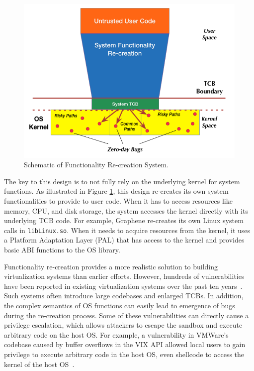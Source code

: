 \begin{figure}%
\centering
\includegraphics[width=1.0\columnwidth]{diagram/Virtualization_Design_Model_02.png}
\caption{\small Schematic of Functionality Re-creation System.}
\label{fig:design_functionality_reimplementation}
\end{figure}

The key to this design is to not fully rely on the underlying
kernel for system functions. As illustrated in Figure \ref{fig:design_functionality_reimplementation},
this design re-creates its own system functionalities to provide to user code.
When it has to %
access resources like memory, CPU, and disk storage, the system accesses the kernel directly with
its underlying TCB code.
For example, Graphene \cite{Graphene-14} re-creates
its own Linux system calls in
\texttt{libLinux.so}. When it needs to acquire resources from
the kernel, it uses a
Platform Adaptation Layer (PAL)  that has access to the kernel
and provides basic ABI functions to the OS library.

Functionality re-creation provides a more realistic solution to building
virtualization systems than earlier efforts.
However, hundreds of vulnerabilities have been
reported in existing virtualization systems over the past ten years~\cite{NVD}.
Such systems often
introduce large codebases and enlarged TCBs. In addition, the
complex semantics of OS functions can easily lead to emergence of bugs during
the re-creation process. Some of these vulnerabilities
can directly cause a privilege escalation, which allows attackers to escape the sandbox
and execute arbitrary code on the host OS.
For example, a vulnerability in VMWare's codebase caused by buffer overflows in the VIX
API allowed local users to
gain privilege to execute arbitrary code in the host
OS, even shellcode to access the kernel of the host OS~\cite{CVE-2008-2100}.

